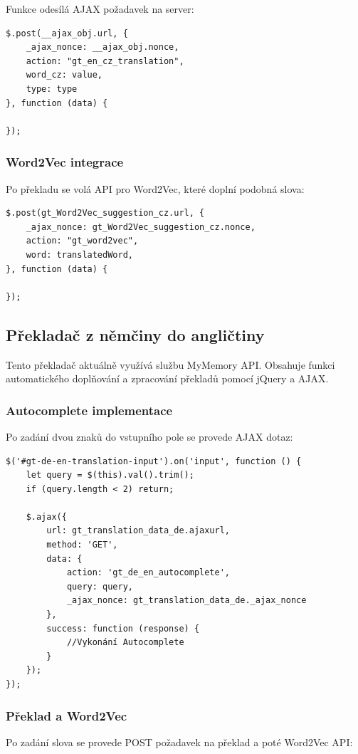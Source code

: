 \documentclass[czech, ba, kiv, he]{fasthesis}
\begin{document}
Funkce odesílá AJAX požadavek na server:

\begin{lstlisting}[caption={AJAX požadavek}]
$.post(__ajax_obj.url, {
    _ajax_nonce: __ajax_obj.nonce,
    action: "gt_en_cz_translation",
    word_cz: value,
    type: type
}, function (data) {
   
});
\end{lstlisting}

\subsubsection*{Word2Vec integrace}
Po překladu se volá API pro Word2Vec, které doplní podobná slova:

\begin{lstlisting}[caption={API pro Word2Vec}]
$.post(gt_Word2Vec_suggestion_cz.url, {
    _ajax_nonce: gt_Word2Vec_suggestion_cz.nonce,
    action: "gt_word2vec",
    word: translatedWord,
}, function (data) {
   
});
\end{lstlisting}

\subsection{Překladač z němčiny do angličtiny}

Tento překladač aktuálně využívá službu MyMemory API. Obsahuje funkci automatického doplňování a zpracování překladů pomocí jQuery a AJAX.

\subsubsection*{Autocomplete implementace}
Po zadání dvou znaků do vstupního pole se provede AJAX dotaz:

\begin{lstlisting}[caption={Autocomplete}]
$('#gt-de-en-translation-input').on('input', function () {
    let query = $(this).val().trim();
    if (query.length < 2) return;

    $.ajax({
        url: gt_translation_data_de.ajaxurl,
        method: 'GET',
        data: {
            action: 'gt_de_en_autocomplete',
            query: query,
            _ajax_nonce: gt_translation_data_de._ajax_nonce
        },
        success: function (response) {
            //Vykonání Autocomplete
        }
    });
});
\end{lstlisting}

\subsubsection*{Překlad a Word2Vec}
Po zadání slova se provede POST požadavek na překlad a poté Word2Vec API:
\end{document}
